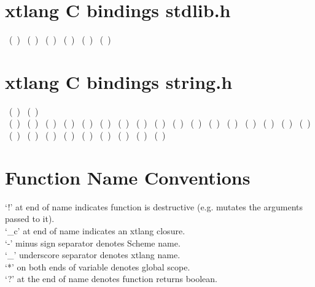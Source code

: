 \documentclass[10pt, twoside]{article}   	%
\begin{document}
\begin{multicols}{3}
\section*{xtlang C bindings stdlib.h}
\begin{multicols}{2}
~(~)
~(~)
~(~)
~(~)
~(~)
~(~) \\
\end{multicols}


\section*{xtlang C bindings string.h}
\begin{multicols}{2}
~(~)
~(~) \\
~(~)
~(~)
~(~)
~(~)
~(~)
~(~)
~(~)
~(~)
~(~)
~(~)
~(~)
~(~)
~(~)
~(~)
~(~)
~(~)
~(~)
~(~)
~(~)
~(~)
~(~)
~(~)
~(~)
~(~)
~(~)
~(~) \\
\end{multicols}
\scriptsize


\section*{Function Name Conventions}
`!' at end of name indicates function is destructive (e.g. mutates the arguments passed to it). \\
`\_c' at end of name indicates an xtlang closure. \\
`-' minus sign separator denotes Scheme name. \\
`\_' underscore separator denotes xtlang name. \\
`*' on both ends of variable denotes global scope. \\
`?' at the end of name denotes function returns boolean. 


\end{multicols}
\end{document}
